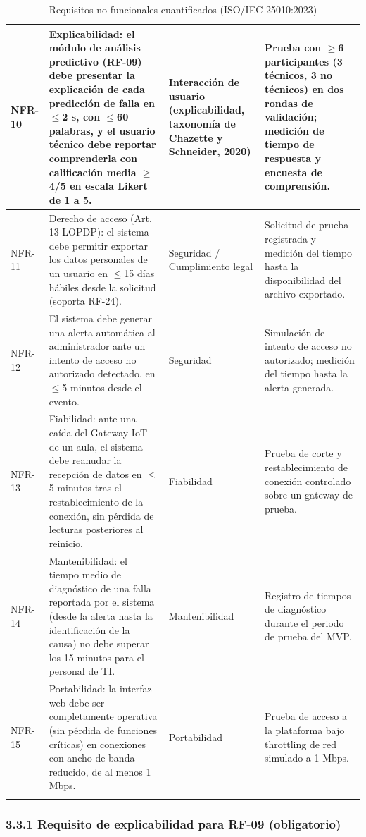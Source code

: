 \begin{longtable}{|p{3.9cm}|p{3.9cm}|p{3.9cm}|p{3.9cm}|}
NFR-10 & Explicabilidad: el módulo de análisis predictivo (RF-09) debe presentar la explicación de cada predicción de falla en $\leq$2 s, con $\leq$60 palabras, y el usuario técnico debe reportar comprenderla con calificación media $\geq$4/5 en escala Likert de 1 a 5. & Interacción de usuario (explicabilidad, taxonomía de Chazette y Schneider, 2020) & Prueba con $\geq$6 participantes (3 técnicos, 3 no técnicos) en dos rondas de validación; medición de tiempo de respuesta y encuesta de comprensión. \\ \hline
NFR-11 & Derecho de acceso (Art. 13 LOPDP): el sistema debe permitir exportar los datos personales de un usuario en $\leq$15 días hábiles desde la solicitud (soporta RF-24). & Seguridad / Cumplimiento legal & Solicitud de prueba registrada y medición del tiempo hasta la disponibilidad del archivo exportado. \\ \hline
NFR-12 & El sistema debe generar una alerta automática al administrador ante un intento de acceso no autorizado detectado, en $\leq$5 minutos desde el evento. & Seguridad & Simulación de intento de acceso no autorizado; medición del tiempo hasta la alerta generada. \\ \hline
NFR-13 & Fiabilidad: ante una caída del Gateway IoT de un aula, el sistema debe reanudar la recepción de datos en $\leq$5 minutos tras el restablecimiento de la conexión, sin pérdida de lecturas posteriores al reinicio. & Fiabilidad & Prueba de corte y restablecimiento de conexión controlado sobre un gateway de prueba. \\ \hline
NFR-14 & Mantenibilidad: el tiempo medio de diagnóstico de una falla reportada por el sistema (desde la alerta hasta la identificación de la causa) no debe superar los 15 minutos para el personal de TI. & Mantenibilidad & Registro de tiempos de diagnóstico durante el periodo de prueba del MVP. \\ \hline
NFR-15 & Portabilidad: la interfaz web debe ser completamente operativa (sin pérdida de funciones críticas) en conexiones con ancho de banda reducido, de al menos 1 Mbps. & Portabilidad & Prueba de acceso a la plataforma bajo throttling de red simulado a 1 Mbps. \\ \hline
\caption{Requisitos no funcionales cuantificados (ISO/IEC 25010:2023)}
\end{longtable}
\endgroup

\subsubsection*{3.3.1 Requisito de explicabilidad para RF-09 (obligatorio)}

